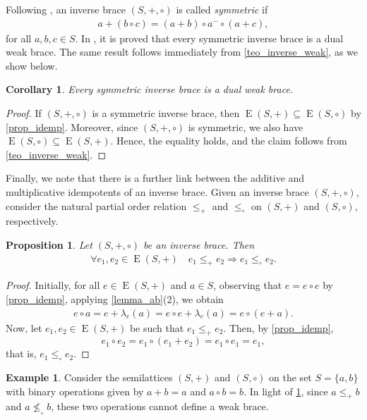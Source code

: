 \documentclass[preprint,1p]{elsarticle}
\newtheorem{prop}[theor]{Proposition}
\newtheorem{cor}[theor]{Corollary}
\theoremstyle{definition}               %
\newtheorem{ex}[theor]{Example}
\DeclareMathOperator{\E}{E}
\begin{document}
   Following \cite{Wang25x}, an inverse brace $(S, +, \circ)$ is called \emph{symmetric} if \begin{align*}
a + (b\circ c) = (a+b)\circ a^-\circ (a+c),
\end{align*}
for all $a,b,c \in S$. In \cite[Proposition 4.2]{Wang25x}, it is proved that every symmetric inverse brace is a dual weak brace. The same result follows immediately from \cref{teo_inverse_weak}, as we show below.
\begin{cor} Every symmetric inverse brace is a dual weak brace. \end{cor}
\begin{proof}
    If $(S,+,\circ)$ is a symmetric inverse brace, then $\E(S,+)\subseteq \E(S,\circ)$ by \cref{prop_idemp}. Moreover, since $(S,+,\circ)$ is symmetric, we also have $\E(S,\circ)\subseteq \E(S,+)$. Hence, the equality holds, and the claim follows from \cref{teo_inverse_weak}.
\end{proof}

\medskip

Finally, we note that there is a further link between the additive and multiplicative idempotents of an inverse brace. Given an inverse brace $(S,+,\circ)$, consider the natural partial order relation $\leq_+$ and $\leq_{\circ}$ on $(S, +)$ and $(S,\circ)$, respectively.

\begin{prop}\label{order}
     Let $(S,+,\circ)$ be an inverse brace. Then
     \begin{align*}
         \forall e_1, e_2 \in \E(S,+) \quad e_1 \leq_+ e_2 \Longrightarrow e_1 \leq_\circ e_2.
     \end{align*}
\end{prop}
\begin{proof}
Initially, for all $e \in \E(S, +)$ and $a\in S$,  observing that $e=e \circ e$ by \cref{prop_idemp},  applying \cref{lemma_ab}(2), we obtain
\begin{align*}
    e \circ a=e+\lambda_e(a) =e \circ e+\lambda_e (a)=e \circ (e+a).
\end{align*}
    Now, let $e_1, e_2 \in \E(S, +)$ be such that $e_1 \leq_+ e_2$. Then, by \cref{prop_idemp}, $$e_1\circ e_2 = e_1\circ(e_1+e_2)=e_1\circ e_1=e_1,$$ that is, $e_1 \leq_\circ e_2$.
\end{proof}

\smallskip

\begin{ex}
 Consider the semilattices $(S, +)$ and $(S, \circ)$ on the set $S=\{a, b\}$ with binary operations given by $a+b=a$ and $a \circ b=b$.
In light of \cref{order}, since $a \leq_+ b$ and $a \nleq_\circ b$, these two operations cannot define a weak brace.
\end{ex}
\end{document}
